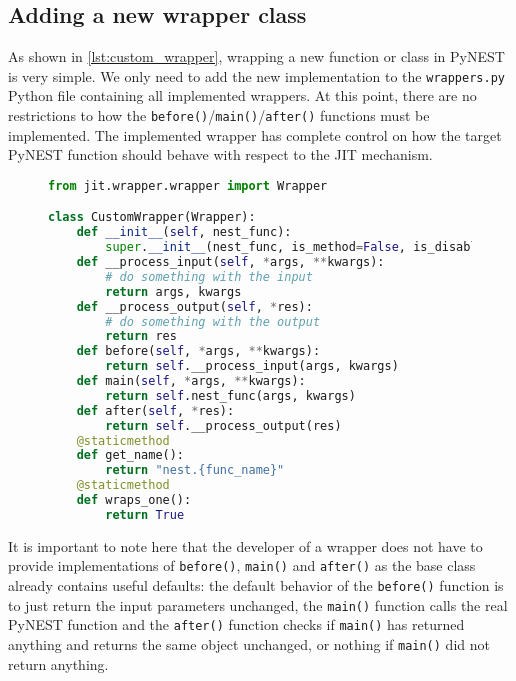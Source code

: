 \subsection{Adding a new wrapper class}

As shown in \autoref{lst:custom_wrapper}, wrapping a new function or class in PyNEST is very simple. We only need to add the new implementation to the \texttt{wrappers.py} Python file containing all implemented wrappers. At this point, there are no restrictions to how the \texttt{before()}/\texttt{main()}/\texttt{after()} functions must be implemented. The implemented wrapper has complete control on how the target PyNEST function should behave with respect to the JIT mechanism.

\begin{figure}[ht!]
\centering
 \begin{lstlisting}[language=Python, label=lst:custom_wrapper, caption={CustomWrapper example}]
from jit.wrapper.wrapper import Wrapper

class CustomWrapper(Wrapper):
    def __init__(self, nest_func):
        super.__init__(nest_func, is_method=False, is_disabled=False)
    def __process_input(self, *args, **kwargs):
        # do something with the input
        return args, kwargs
    def __process_output(self, *res):
        # do something with the output
        return res
    def before(self, *args, **kwargs):
        return self.__process_input(args, kwargs)
    def main(self, *args, **kwargs):
        return self.nest_func(args, kwargs)
    def after(self, *res):
        return self.__process_output(res)
    @staticmethod
    def get_name():
        return "nest.{func_name}"
    @staticmethod
    def wraps_one():
        return True
\end{lstlisting}
\end{figure}


It is important to note here that the developer of a wrapper does not have to provide implementations of \texttt{before()}, \texttt{main()} and \texttt{after()} as the base class already contains useful defaults: the default behavior of the \texttt{before()} function is to just return the input parameters unchanged, the \texttt{main()} function calls the real PyNEST function and the \texttt{after()} function checks if \texttt{main()} has returned anything and returns the same object unchanged, or nothing if \texttt{main()} did not return anything.

